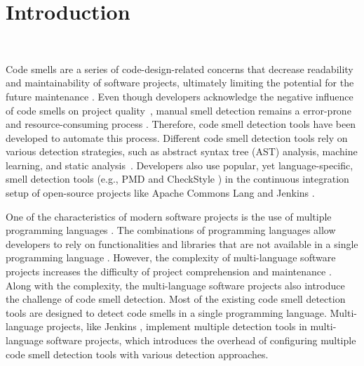 \section{Introduction}~\label{sec:introduction}


Code smells are a series of code-design-related concerns that decrease
readability \cite{5741260} and maintainability \cite{6392174,6405287} of
software projects, ultimately limiting the potential for the future maintenance
\cite{Fowler_Beck}. Even though developers acknowledge the negative influence
of code smells on project quality~\cite{developersCare}, manual smell detection
remains a error-prone and resource-consuming process
\cite{DetectingDefectsInObject}. Therefore, code smell detection tools have
been developed to automate this process. Different code smell detection tools
rely on various detection strategies, such as abstract syntax tree (AST)
analysis, machine learning, and static analysis~\cite{ML}. Developers also use
popular, yet language-specific, smell detection tools (e.g., PMD \cite{PMD} and
CheckStyle \cite{CheckStyle}) in the continuous integration setup of
open-source projects like Apache Commons Lang \cite{ApacheCommonsLang} and
Jenkins \cite{Jekins}.

One of the characteristics of modern software projects is the use of multiple
programming languages \cite{723183}. The combinations of programming languages
allow developers to rely on functionalities and libraries that are not available
in a single programming language \cite{7476675}. However, the complexity of
multi-language software projects increases the difficulty of project
comprehension and maintenance \cite{7476675, 10.1109/SCAM.2012.11, 7396422}.
Along with the complexity, the multi-language software projects also introduce
the challenge of code smell detection. Most of the existing code smell detection
tools are designed to detect code smells in a single programming language.
Multi-language projects, like Jenkins \cite{Jekins}, implement multiple
detection tools in multi-language software projects, which introduces the
overhead of configuring multiple code smell detection tools with various
detection approaches.

